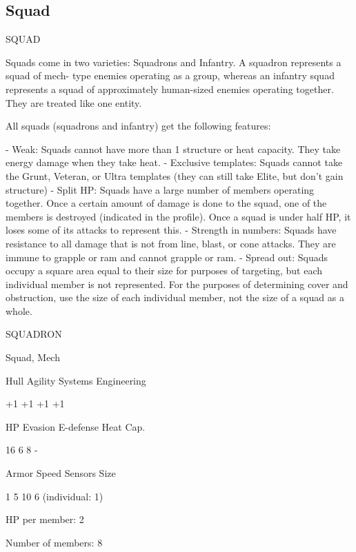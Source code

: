 \subsection{Squad}

                                                 SQUAD

Squads come in two varieties: Squadrons and Infantry. A squadron represents a squad of mech-
type enemies operating as a group, whereas an infantry squad represents a squad of
approximately human-sized enemies operating together. They are treated like one entity.


All squads (squadrons and infantry) get the following features:

    -   Weak: Squads cannot have more than 1 structure or heat capacity. They take energy
        damage when they take heat.
    -   Exclusive templates: Squads cannot take the Grunt, Veteran, or Ultra templates (they
        can still take Elite, but don't gain structure)
    -   Split HP: Squads have a large number of members operating together. Once a certain
        amount of damage is done to the squad, one of the members is destroyed (indicated in
        the profile). Once a squad is under half HP, it loses some of its attacks to represent this.
    -   Strength in numbers: Squads have resistance to all damage that is not from line, blast,
        or cone attacks. They are immune to grapple or ram and cannot grapple or ram.
    -   Spread out: Squads occupy a square area equal to their size for purposes of targeting,
        but each individual member is not represented. For the purposes of determining cover
        and obstruction, use the size of each individual member, not the size of a squad as a
        whole.

       SQUADRON

       Squad, Mech

       Hull       Agility     Systems       Engineering

       +1         +1          +1            +1

       HP         Evasion     E-defense     Heat Cap.

       16         6           8             -

       Armor      Speed       Sensors       Size

       1          5           10            6 (individual:
                                            1)

HP per member: 2

Number of members: 8


